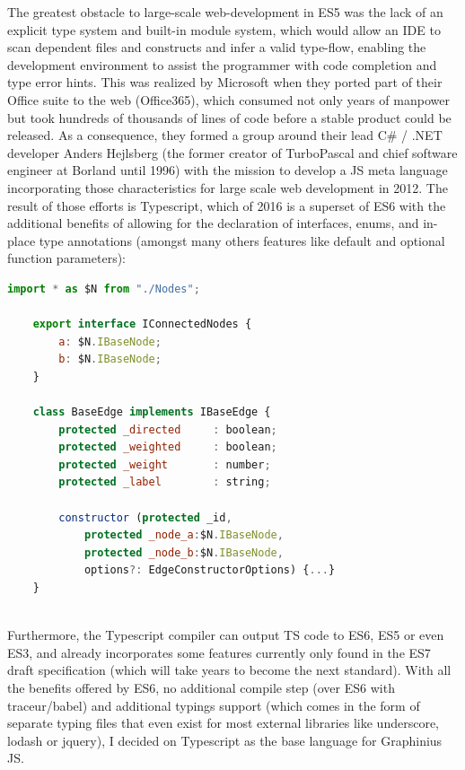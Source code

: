 	The greatest obstacle to large-scale web-development in ES5 was the lack of an explicit type system and built-in module system, which would allow an IDE to scan dependent files and constructs and infer a valid type-flow, enabling the development environment to assist the programmer with code completion and type error hints. This was realized by Microsoft when they ported part of their Office suite to the web (Office365), which consumed not only years of manpower but took hundreds of thousands of lines of code before a stable product could be released. As a consequence, they formed a group around their lead C\# / .NET developer Anders Hejlsberg (the former creator of TurboPascal and chief software engineer at Borland until 1996) with the mission to develop a JS meta language incorporating those characteristics for large scale web development in 2012. The result of those efforts is Typescript, which of 2016 is a superset of ES6 with the additional benefits of allowing for the declaration of interfaces, enums, and in-place type annotations (amongst many others features like default and optional function parameters): 
	
	\begin{lstlisting}[caption={Typescript sample featuring import of an external module, an exported interface definition, type annotations, instance variable setting via constructor specifiers (protected) as well as optional parameters}, label={fig:TS example}, language=JavaScript]
	import * as $N from "./Nodes";
	
	export interface IConnectedNodes {
		a: $N.IBaseNode;
		b: $N.IBaseNode;
	}
	
	class BaseEdge implements IBaseEdge {
		protected _directed		: boolean;
		protected _weighted 	: boolean;
		protected _weight		: number;
		protected _label		: string;
		
		constructor (protected _id,
			protected _node_a:$N.IBaseNode,
			protected _node_b:$N.IBaseNode,
			options?: EdgeConstructorOptions) {...}
	}
	
	\end{lstlisting}
	
	Furthermore, the Typescript compiler can output TS code to ES6, ES5 or even ES3, and already incorporates some features currently only found in the ES7 draft specification (which will take years to become the next standard). With all the benefits offered by ES6, no additional compile step (over ES6 with traceur/babel) and additional typings support (which comes in the form of separate typing files that even exist for most external libraries like underscore, lodash or jquery), I decided on Typescript as the base language for Graphinius JS.
	

